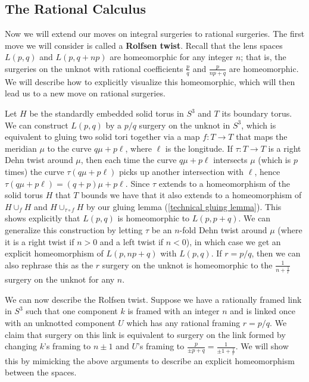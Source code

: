 \subsection{The Rational Calculus}
\label{The Rational Calculus}


Now we will extend our moves on integral surgeries to rational surgeries. The first move we will consider is called a \textbf{Rolfsen twist}. Recall that the lens spaces $L(p,q)$ and $L(p,q+np)$ are homeomorphic for any integer $n$; that is, the surgeries on the unknot with rational coefficients $\frac{p}{q}$ and $\frac{p}{np + q}$ are homeomorphic. We will describe how to explicitly visualize this homeomorphic, which will then lead us to a new move on rational surgeries.

Let $H$ be the standardly embedded solid torus in $S^3$ and $T$ its boundary torus. We can construct $L(p,q)$ by a $p/q$ surgery on the unknot in $S^3$, which is equivalent to gluing two solid tori together via a map $f : T \rightarrow T$ that maps the meridian $\mu$ to the curve $q\mu+p\ell$, where $\ell$ is the longitude. If $\tau : T \rightarrow T$ is a right Dehn twist around $\mu$, then each time the curve $q\mu+p\ell$ intersects $\mu$ (which is $p$ times) the curve $\tau(q\mu+p\ell)$ picks up another intersection with $\ell$, hence $\tau(q\mu+p\ell) = (q+p)\mu + p\ell$. Since $\tau$ extends to a homeomorphism of the solid torus $H$ that $T$ bounds we have that it also extends to a homeomorphism of $H \cup_f H$ and $H \cup_{\tau \circ f} H$ by our gluing lemma (\cref{technical gluing lemma}). This shows explicitly that $L(p,q)$ is homeomorphic to $L(p,p+q)$. We can generalize this construction by letting $\tau$ be an $n$-fold Dehn twist around $\mu$ (where it is a right twist if $n>0$ and a left twist if $n<0$), in which case we get an explicit homeomorphism of $L(p,np+q)$ with $L(p,q)$. If $r=p/q$, then we can also rephrase this as the $r$ surgery on the unknot is homeomorphic to the $\frac{1}{n + \frac{1}{r}}$ surgery on the unknot for any $n$.

We can now describe the Rolfsen twist. Suppose we have a rationally framed link in $S^3$ such that one component $k$ is framed with an integer $n$ and is linked once with an unknotted component $U$ which has any rational framing $r=p/q$. We claim that surgery on this link is equivalent to surgery on the link formed by changing $k$'s framing to $n \pm 1$ and $U$'s framing to $\frac{p}{\pm p + q} = \frac{1}{\pm 1 + \frac{1}{r}}$. We will show this by mimicking the above arguments to describe an explicit homeomorphism between the spaces. 

